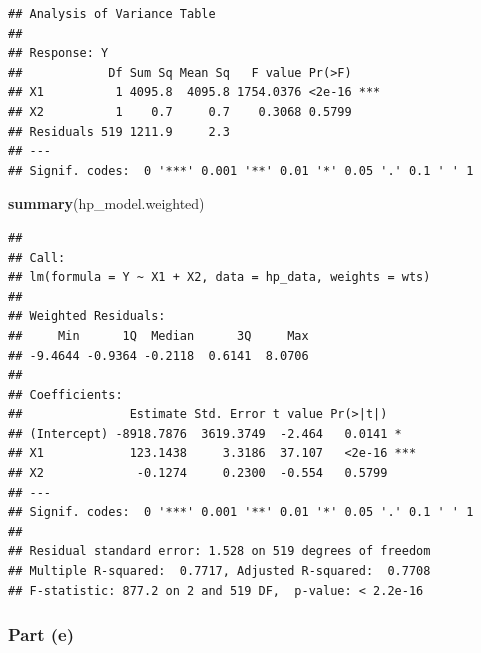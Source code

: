 \documentclass[
]{article}
\newenvironment{Shaded}{\begin{snugshade}}{\end{snugshade}}
\newcommand{\CommentTok}[1]{\textcolor[rgb]{0.56,0.35,0.01}{\textit{#1}}}
\newcommand{\FunctionTok}[1]{\textcolor[rgb]{0.13,0.29,0.53}{\textbf{#1}}}
\newcommand{\NormalTok}[1]{#1}
\newcommand{\OtherTok}[1]{\textcolor[rgb]{0.56,0.35,0.01}{#1}}
\newcommand{\SpecialCharTok}[1]{\textcolor[rgb]{0.81,0.36,0.00}{\textbf{#1}}}
\begin{document}
\begin{verbatim}
## Analysis of Variance Table
## 
## Response: Y
##            Df Sum Sq Mean Sq   F value Pr(>F)    
## X1          1 4095.8  4095.8 1754.0376 <2e-16 ***
## X2          1    0.7     0.7    0.3068 0.5799    
## Residuals 519 1211.9     2.3                     
## ---
## Signif. codes:  0 '***' 0.001 '**' 0.01 '*' 0.05 '.' 0.1 ' ' 1
\end{verbatim}

\begin{Shaded}
\begin{Highlighting}[]
\FunctionTok{summary}\NormalTok{(hp\_model.weighted)}
\end{Highlighting}
\end{Shaded}

\begin{verbatim}
## 
## Call:
## lm(formula = Y ~ X1 + X2, data = hp_data, weights = wts)
## 
## Weighted Residuals:
##     Min      1Q  Median      3Q     Max 
## -9.4644 -0.9364 -0.2118  0.6141  8.0706 
## 
## Coefficients:
##               Estimate Std. Error t value Pr(>|t|)    
## (Intercept) -8918.7876  3619.3749  -2.464   0.0141 *  
## X1            123.1438     3.3186  37.107   <2e-16 ***
## X2             -0.1274     0.2300  -0.554   0.5799    
## ---
## Signif. codes:  0 '***' 0.001 '**' 0.01 '*' 0.05 '.' 0.1 ' ' 1
## 
## Residual standard error: 1.528 on 519 degrees of freedom
## Multiple R-squared:  0.7717, Adjusted R-squared:  0.7708 
## F-statistic: 877.2 on 2 and 519 DF,  p-value: < 2.2e-16
\end{verbatim}

\hypertarget{part-e-1}{%
\subsubsection{Part (e)}\label{part-e-1}}


\begin{Shaded}
\end{Shaded}
\end{document}
